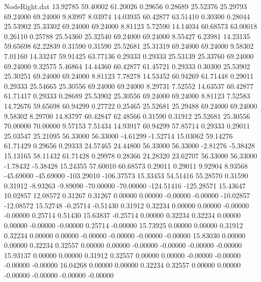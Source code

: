 \begin{filecontents}{NodeRight.dat}
  13.92785   59.40002   61.20026     0.29656    0.28689   25.52376   25.29793   69.24000   69.24000    9.83997    8.03974
  14.03935   60.42877   63.51410     0.30300    0.28044   25.53902   25.33302   69.24000   69.24000    8.81123    5.72590
  14.14034   60.68573   63.00018     0.26110    0.25788   25.54360   25.32540   69.24000   69.24000    8.55427    6.23981
  14.23135   59.65698   62.22839     0.31590    0.31590   25.52681   25.31319   69.24000   69.24000    9.58302    7.01160
  14.33247   59.91425   63.77136     0.29333    0.29333   25.53139   25.33760   69.24000   69.24000    9.32575    5.46864
  14.44360   60.42877   61.45721     0.29333    0.30300   25.53902   25.30251   69.24000   69.24000    8.81123    7.78278
  14.53452   60.94269   61.71448     0.29011    0.29333   25.54665   25.30556   69.24000   69.24000    8.29731    7.52552
  14.63537   60.42877   61.71417     0.29333    0.28689   25.53902   25.30556   69.24000   69.24000    8.81123    7.52583
  14.72676   59.65698   60.94299     0.27722    0.25465   25.52681   25.29488   69.24000   69.24000    9.58302    8.29700
  14.83797   60.42847   62.48566     0.31590    0.31912   25.52681   25.30556   70.00000   70.00000    9.57153    7.51434
  14.93917   60.94299   57.85714     0.29333    0.29011   25.03547   25.21095   56.33000   56.33000   -4.61299   -1.52714
  15.03062   59.14276   61.71429     0.29656    0.29333   24.57465   24.44800   56.33000   56.33000   -2.81276   -5.38428
  15.13165   58.11432   61.71428     0.29978    0.28366   24.28320   23.62707   56.33000   56.33000   -1.78432   -5.38428
  15.24355   57.60010   60.68573     0.29011    0.29011    9.92904    8.93568  -45.69000  -45.69000 -103.29010 -106.37573
  15.33453   54.51416   55.28570     0.31590    0.31912   -8.93263   -9.89090  -70.00000  -70.00000 -124.51416 -125.28571
  15.43647   10.02857   12.08572     0.31267    0.31267    0.00000    0.00000   -0.00000   -0.00000  -10.02857  -12.08572
  15.52748   -0.25714   -0.51430     0.31912    0.32234    0.00000    0.00000   -0.00000   -0.00000    0.25714    0.51430
  15.63837   -0.25714    0.00000     0.32234    0.32234    0.00000    0.00000   -0.00000   -0.00000    0.25714   -0.00000
  15.73925    0.00000    0.00000     0.31912    0.32234    0.00000    0.00000   -0.00000   -0.00000   -0.00000   -0.00000
  15.83030    0.00000    0.00000     0.32234    0.32557    0.00000    0.00000   -0.00000   -0.00000   -0.00000   -0.00000
  15.93137    0.00000    0.00000     0.31912    0.32557    0.00000    0.00000   -0.00000   -0.00000   -0.00000   -0.00000
  16.04268    0.00000    0.00000     0.32234    0.32557    0.00000    0.00000   -0.00000   -0.00000   -0.00000   -0.00000

\end{filecontents}
